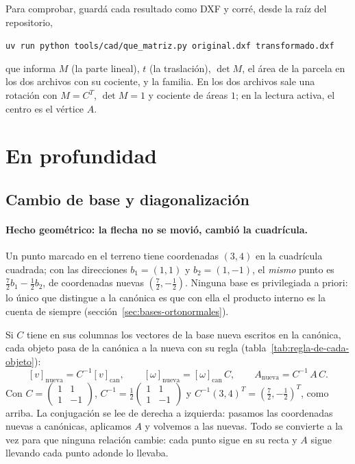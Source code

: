 Para comprobar, guardá cada resultado como DXF y corré, desde la raíz del repositorio,
\begin{center}\small
\texttt{uv run python tools/cad/que\_matriz.py original.dxf transformado.dxf}
\end{center}
que informa \(M\) (la parte lineal), \(t\) (la traslación), \(\det M\), el área de la parcela en
los dos archivos con su cociente, y la familia. En los dos archivos sale una rotación con
\(M=C^T\), \(\det M=1\) y cociente de áreas \(1\); en la lectura activa, el centro es el
vértice \(A\).

\section{En profundidad}

\subsection{Cambio de base y diagonalización}\label{sec:cambio-base}

{\small\vspace{1mm}\par}

\paragraph{Hecho geométrico: la flecha no se movió, cambió la cuadrícula.} Un punto marcado en
el terreno tiene coordenadas \((3,4)\) en la cuadrícula cuadrada; con las direcciones \(b_1=(1,1)\) y
\(b_2=(1,-1)\), el \emph{mismo} punto es \(\tfrac72b_1-\tfrac12b_2\), de coordenadas nuevas
\((\tfrac72,-\tfrac12)\). Ninguna base es privilegiada a priori: lo único que distingue a la
canónica es que con ella el producto interno es la cuenta de siempre
(sección~\ref{sec:bases-ortonormales}).

\begin{resultado}
Si \(C\) tiene en sus columnas los vectores de la base nueva escritos en la canónica, cada
objeto pasa de la canónica a la nueva con su regla (tabla~\ref{tab:regla-de-cada-objeto}):
\[
  [v]_{\text{nueva}}=C^{-1}[v]_{\text{can}},\qquad
  [\omega]_{\text{nueva}}=[\omega]_{\text{can}}\,C,\qquad
  A_{\text{nueva}}=C^{-1}\,A\,C .
\]
Con \(C=\begin{pmatrix}1&1\\1&-1\end{pmatrix}\), \(C^{-1}=\tfrac12\begin{pmatrix}1&1\\1&-1\end{pmatrix}\)
y \(C^{-1}(3,4)^T=(\tfrac72,-\tfrac12)^T\), como arriba. La conjugación se lee de derecha a
izquierda: pasamos las coordenadas nuevas a canónicas, aplicamos \(A\) y volvemos a las nuevas.
Todo se convierte a la vez para que ninguna relación cambie: cada punto sigue en su recta y
\(A\) sigue llevando cada punto adonde lo llevaba.
\end{resultado}

